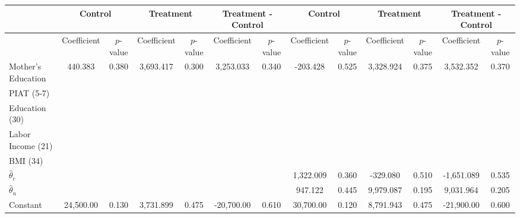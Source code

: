 \begin{tabular}{lcccccccccccc} \toprule
&\multicolumn{2}{c}{Control} & \multicolumn{2}{c}{Treatment} & \multicolumn{2}{c}{Treatment - Control} & \multicolumn{2}{c}{Control} & \multicolumn{2}{c}{Treatment} & \multicolumn{2}{c}{Treatment - Control} \\ \midrule
 & Coefficient  & $p$-value  & Coefficient  & $p$-value & Coefficient  & $p$-value  & Coefficient  & $p$-value  & Coefficient  & $p$-value  & Coefficient  & $p$-value \\ \midrule
Mother's Education &   440.383 &     0.380 &  3,693.417 &     0.300 &  3,253.033 &     0.340 &  -203.428 &     0.525 &  3,328.924 &     0.375 &  3,532.352 &     0.370 \\  
PIAT (5-7) &         &         &         &         &         &         &         &         &         &         &         &         \\
Education (30) &         &         &         &         &         &         &         &         &         &         &         &         \\
Labor Income (21) &         &         &         &         &         &         &         &         &         &         &         &         \\
BMI (34) &         &         &         &         &         &         &         &         &         &         &         &         \\
$\hat{\theta}_{c}$ &         &         &         &         &         &         &  1,322.009 &     0.360 &  -329.080 &     0.510 & -1,651.089 &     0.535 \\  
$\hat{\theta}_{n}$ &         &         &         &         &         &         &   947.122 &     0.445 &  9,979.087 &     0.195 &  9,031.964 &     0.205 \\  
Constant  & 24,500.00 &     0.130 &  3,731.899 &     0.475 & -20,700.00 &     0.610 & 30,700.00 &     0.120 &  8,791.943 &     0.475 & -21,900.00 &     0.600 \\  
\bottomrule \end{tabular}
